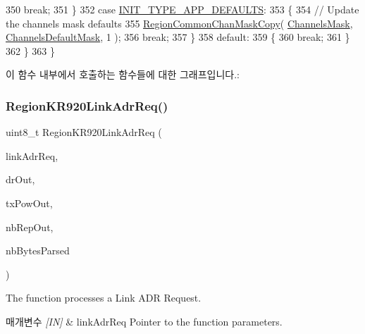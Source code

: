 \begin{DoxyCode}
350             \textcolor{keywordflow}{break};
351         \}
352         \textcolor{keywordflow}{case} \mbox{\hyperlink{group___r_e_g_i_o_n_gga11ecad794560a3d3961bdf1c9a27d3b2a3d260b94611dd833c5243c16ca26c3f0}{INIT\_TYPE\_APP\_DEFAULTS}}:
353         \{
354             \textcolor{comment}{// Update the channels mask defaults}
355             \mbox{\hyperlink{group___r_e_g_i_o_n_c_o_m_m_o_n_ga95f5199d490113269fae7f2e0569e9a0}{RegionCommonChanMaskCopy}}( \mbox{\hyperlink{_region_k_r920_8c_a2188957b5ca6af8092154d7ccbfa5757}{ChannelsMask}}, 
      \mbox{\hyperlink{_region_k_r920_8c_ac127b19779301713d5ed92eb03366a2d}{ChannelsDefaultMask}}, 1 );
356             \textcolor{keywordflow}{break};
357         \}
358         \textcolor{keywordflow}{default}:
359         \{
360             \textcolor{keywordflow}{break};
361         \}
362     \}
363 \}
\end{DoxyCode}
이 함수 내부에서 호출하는 함수들에 대한 그래프입니다.\+:
\mbox{\label{group___r_e_g_i_o_n_k_r920_ga6b2ee965ec46d0c137845d75edc16fd8}} 
\subsubsection{\texorpdfstring{Region\+K\+R920\+Link\+Adr\+Req()}{RegionKR920LinkAdrReq()}}
{\footnotesize\ttfamily uint8\+\_\+t Region\+K\+R920\+Link\+Adr\+Req (\begin{DoxyParamCaption}\item[{\mbox{\hyperlink{group___r_e_g_i_o_n_gad4af503e8d4de1846129e26a799a1e8e}{Link\+Adr\+Req\+Params\+\_\+t}} $\ast$}]{link\+Adr\+Req,  }\item[{int8\+\_\+t $\ast$}]{dr\+Out,  }\item[{int8\+\_\+t $\ast$}]{tx\+Pow\+Out,  }\item[{uint8\+\_\+t $\ast$}]{nb\+Rep\+Out,  }\item[{uint8\+\_\+t $\ast$}]{nb\+Bytes\+Parsed }\end{DoxyParamCaption})}



The function processes a Link A\+DR Request. 


\begin{DoxyParams}{매개변수}
{\em \mbox{[}\+I\+N\mbox{]}} & link\+Adr\+Req Pointer to the function parameters.\\
\hline
\end{DoxyParams}

